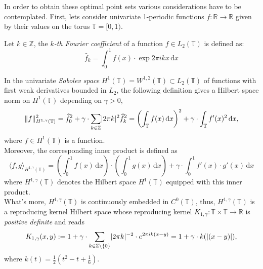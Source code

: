 In order to obtain these optimal point sets various considerations have to be contemplated. First, lets consider univariate 1-periodic functions $f : \mathbb{R} \longrightarrow \mathbb{R}$ given by their values on the torus $\mathbb{T} = [0,1)$.\\

\begin{Def}
    Let $k\in \mathbb{Z}$, the \textit{$k$-th Fourier coefficient} of a function $f\in L_2(\mathbb{T})$ is defined as:
    \begin{equation*}
        \widehat{f}_k = \int_0^1 f(x) \cdot \exp{2\pi ikx} \,\mathrm{d}x
    \end{equation*}
\end{Def}

\vspace{2mm}
In the univariate \textit{Sobolev space} $H^1(\mathbb{T}) = W^{1,2}(\mathbb{T})\subset L_2(\mathbb{T})$ of functions with first weak derivatives bounded in $L_2$, the following definition gives a Hilbert space norm on $H^1(\mathbb{T})$ depending on $\gamma>0$,
\begin{equation*}
    \lVert f\rVert_{H^{1,\gamma}(\mathbb{T})}^2 = \widehat{f}_0^2 + \gamma \cdot \sum_{k\in \mathbb{Z}} \lvert2\pi k\rvert^2 \widehat{f}_k^2 = \left( \int_{\mathbb{T}} f(x) \,\mathrm{d}x \right)^2 + \gamma \cdot \int_{\mathbb{T}} f'(x)^2 \,\mathrm{d}x,
\end{equation*}
where $f \in H^1(\mathbb{T})$ is a function.\\

Moreover, the corresponding inner product is defined as
\begin{equation*}
    \langle f,g \rangle_{H^{1,\gamma}(\mathbb{T})} = \left( \int_0^1 f(x) \,\mathrm{d}x \right) \cdot \left( \int_0^1 g(x) \,\mathrm{d}x \right) + \gamma \cdot \int_0^1 f'(x)\cdot g'(x) \,\mathrm{d}x 
\end{equation*}
where $H^{1,\gamma}(\mathbb{T})$ denotes the Hilbert space $H^1(\mathbb{T})$ equipped with this inner product.\\

What's more, $H^{1,\gamma}(\mathbb{T})$ is continuously embedded in $C^0(\mathbb{T})$, thus, $H^{1,\gamma}(\mathbb{T})$ is a reproducing kernel Hilbert space whose reproducing kernel $K_{1,\gamma} : \mathbb{T}\times\mathbb{T} \longrightarrow \mathbb{R}$ is \textit{positive definite} and reads
\begin{equation*}
    K_{1,\gamma}(x,y) := 1 + \gamma \cdot \sum_{k\in \mathbb{Z}\setminus\{0\}} \lvert2\pi k\rvert^{-2} \cdot e^{2\pi ik(x-y)} = 1 + \gamma \cdot k(\lvert(x-y)\rvert), 
\end{equation*}
where $k(t) = \frac{1}{2} (t^2 - t + \frac{1}{6})$.\\

